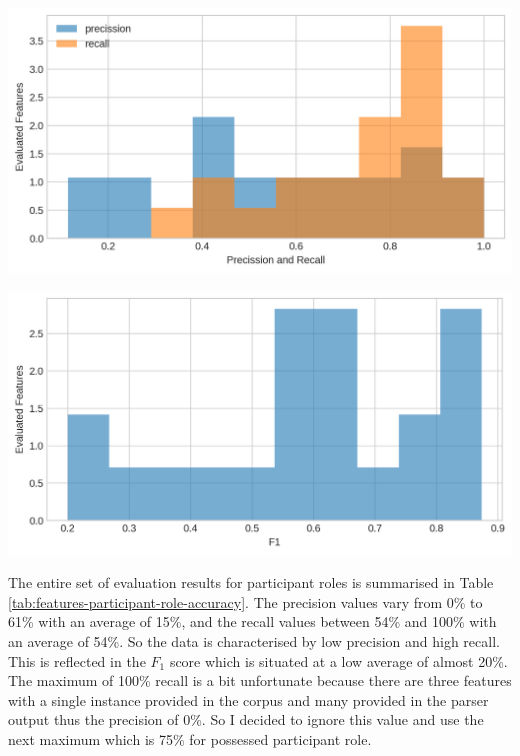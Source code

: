     \vspace{1em}
    \noindent
    \begin{minipage}[t]{0.49\textwidth}
        \centering
        \includegraphics[width=\textwidth]{evaluation-results/figures-old/accuracy-syntactic-mood-precission-recall.png}
        \label{fig:participant-role-precission-recall}
    \end{minipage}
    \quad
    \begin{minipage}[t]{0.49\textwidth}
        \centering
        \includegraphics[width=\textwidth]{evaluation-results/figures-old/accuracy-syntactic-mood-f1.png}
        \label{fig:participant-role-precission-f1}
    \end{minipage}
    \vspace{1em}
    
    The entire set of evaluation results for participant roles is summarised in Table \ref{tab:features-participant-role-accuracy}. The precision values vary from 0\% to 61\% with an average of 15\%, and the recall values between 54\% and 100\% with an average of 54\%. So the data is characterised by low precision and high recall. This is reflected in the $F_1$ score which is situated at a low average of almost 20\%. The maximum of 100\% recall is a bit unfortunate because there are three features with a single instance provided in the corpus and many provided in the parser output thus the precision of 0\%. So I decided to ignore this value and use the next maximum which is 75\% for possessed participant role.
    
